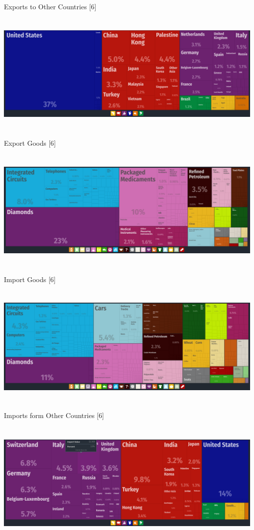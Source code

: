 \documentclass[10pt]{article}
\begin{document}
\\
\begin{center}
Exports to Other Countries [6]
\end{center}
\includegraphics[width=6in, height=6cm]{exports.png}
\\
\begin{center}
Export Goods [6]
\end{center}
\includegraphics[width=6in, height=6cm]{exports1.png}
\\
\begin{center}
Import Goods [6]
\end{center}
\includegraphics[width=6in, height=6cm]{imports.png}
\\
\newpage
\begin{center}
Imports form Other Countries [6]
\end{center}
\includegraphics[width=6in, height=6cm]{imports1.png}
\end{document}
